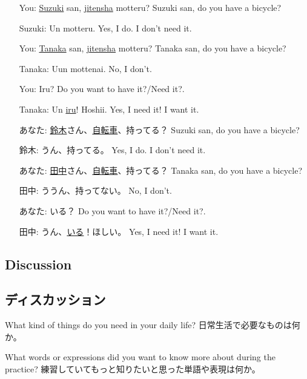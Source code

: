 \documentclass[uplatex,dvipdfmx,b5paper,english,10pt]{jsbook}
\begin{document}
\ifEnglish
\begin{itemize}
  \item[You:] \underline{Suzuki} san, \underline{jitensha} motteru?
    {\tiny\hfill Suzuki san, do you have a bicycle?}
  \item[Suzuki:] Un motteru.
    {\tiny\hfill Yes, I do. I don't need it.}
  \item[You:] \underline{Tanaka} san, \underline{jitensha} motteru?
    {\tiny\hfill Tanaka san, do you have a bicycle?}
  \item[Tanaka:] Uun mottenai.
    {\tiny\hfill No, I don't.}
  \item[You:] Iru?
    {\tiny\hfill Do you want to have it?/Need it?.}
  \item[Tanaka:] Un \underline{iru}! Hoshii.
    {\tiny\hfill Yes, I need it! I want it.}
\end{itemize}
\else
\begin{itemize}
  \item[あなた:] \underline{鈴木}さん、\underline{自転車}、持ってる？
    {\tiny\hfill Suzuki san, do you have a bicycle?}
  \item[鈴木:] うん、持ってる。
    {\tiny\hfill Yes, I do. I don't need it.}
  \item[あなた:] \underline{田中}さん、\underline{自転車}、持ってる？
    {\tiny\hfill Tanaka san, do you have a bicycle?}
  \item[田中:] ううん、持ってない。
    {\tiny\hfill No, I don't.}
  \item[あなた:] いる？
    {\tiny\hfill Do you want to have it?/Need it?.}
  \item[田中:] うん、\underline{いる}！ほしい。
    {\tiny\hfill Yes, I need it! I want it.}
\end{itemize}
\fi

\ifEnglish
\subsection{Discussion}
\else
\subsection{ディスカッション}
\fi

\begin{toiquestion}
\ifEnglish
What kind of things do you need in your daily life?
\else
日常生活で必要なものは何か。
\fi
\end{toiquestion}

\begin{toiquestion}
\ifEnglish
What words or expressions did you want to know more about during the practice?
\else
練習していてもっと知りたいと思った単語や表現は何か。
\fi
\end{toiquestion}
\end{document}
